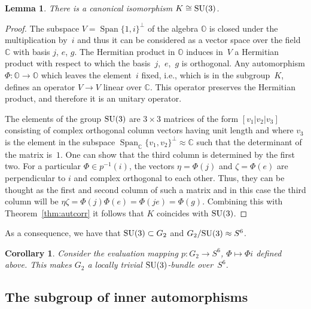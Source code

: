 \documentclass[10pt,a4paper]{amsart}
\numberwithin{equation}{section}
\newtheorem{Corollary}[Theorem]{Corollary}
\newtheorem{Lemma}[Theorem]{Lemma}
\DeclareMathOperator{\Span}{Span}
\newcommand{\SC}{\mathbb{C}} %
\newcommand{\SO}{\mathbb{O}} %
\begin{document}
\begin{Lemma} \label{lem:fibsu3}
 There is a canonical isomorphism $K \cong {\rm SU}(3)$.
\end{Lemma}
\begin{proof}
 The subspace $V=\Span \{1,i\}^\perp$ of the algebra $\SO$ is closed under the multiplication by~$i$ and thus it can be considered as a vector space over the field $\SC$ with basis $j$, $e$, $g$. The Hermitian product in $\SO$ induces in~$V$ a Hermitian product with respect to which the basis~$j$,~$e$,~$g$ is orthogonal. Any automorphism $\Phi\colon \SO \rightarrow \SO$ which leaves the element~$i$ fixed, i.e., which is in the subgroup~$K$, defines an operator $V \rightarrow V$ linear over $\SC$. This operator preserves the Hermitian product, and therefore it is an unitary operator.

 The elements of the group ${\rm SU}(3)$ are $3 \times 3$ matrices of the form $[v_1|v_2|v_3]$ consisting of complex orthogonal column vectors having unit length and where $v_3$ is the element in the subspace $\Span_\SC \{v_1,v_2\}^\perp \approx \SC$ such that the determinant of the matrix is~$1$. One can show that the third column is determined by the first two. For a particular $\Phi \in p^{-1}(i)$, the vectors $\eta=\Phi(j)$ and $\zeta=\Phi(e)$ are perpendicular to $i$ and complex orthogonal to each other. Thus, they can be thought as the first and second column of such a matrix and in this case the third column will be $\eta\zeta=\Phi(j)\Phi(e)=\Phi(je)=\Phi(g)$. Combining this with Theorem~\ref{thm:autcorr} it follows that $K$ coincides with ${\rm SU}(3)$.
\end{proof}

As a consequence, we have that ${\rm SU}(3) \subset G_2$ and $G_2 / {\rm SU}(3) \approx S^6$.

\begin{Corollary} Consider the evaluation mapping $p\colon G_2 \rightarrow S^6$, $\Phi \mapsto \Phi i$ defined above. This makes $G_2$ a locally trivial ${\rm SU}(3)$-bundle over~$S^6$.
\end{Corollary}

\subsection{The subgroup of inner automorphisms}\label{section2.3}
\end{document}
